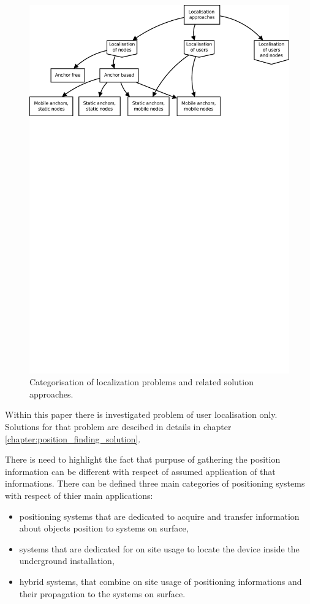 \documentclass[../main.tex]{subfiles}
\begin{document}
\begin{figure}[ht]
\includegraphics[width=\textwidth, trim={0 20cm 0 0},clip]{pictures/localisation_approaches.pdf}
\centering
\caption{Categorisation of localization problems and related solution approaches\cite{discover_beacons_and_position}.}
\label{fig:localisation_approaches}
\end{figure}

Within this paper there is investigated problem of user localisation only. Solutions for that problem are descibed in details in chapter \ref{chapter:position_finding_solution}.


There is need to highlight the fact that purpuse of gathering the position information can be different with respect of assumed application of that informations. There can be defined three main categories of positioning systems with respect of thier main applications:
\begin{itemize}
	\item positioning systems that are dedicated to acquire and transfer information about objects position to systems on surface,
	\item systems that are dedicated for on site usage to locate the device inside the underground installation,
	\item hybrid systems, that combine on site usage of positioning informations and their propagation to the systems on surface.
\end{itemize}
\end{document}
